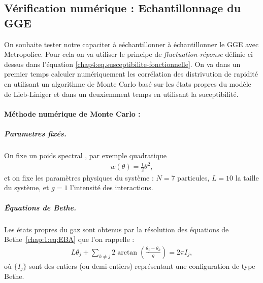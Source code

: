\subsection{Vérification numérique : Echantillonnage du GGE}

On souhaite tester notre capaciter à eéchantillonner à échantillonner le GGE avec Metropolice. Pour cela on va utiliser le principe de \emph{fluctuation-réponse} définie ci dessus dans l'équation \eqref{chap4:eq.susceptibilite-fonctionnelle}. On va dans un premier temps calculer numériquement les corrélation des distrivution de rapidité en utilisant un algorithme de Monte Carlo basé sur les états propres du modèle de Lieb-Liniger et dans un deuxiemment temps en utilisant la suceptibilité.




\paragraph{Méthode numérique de Monte Carlo  :} 

\subparagraph{Parametres fixés.}
On fixe un poids spectral , par exemple quadratique
\begin{eqnarray}
	w(\theta) = \tfrac{1}{2} \theta^2,
\end{eqnarray}
et on fixe les paramètres physiques du système : \( N = 7 \) particules, \( L = 10 \) la taille du système, et \( g = 1 \) l’intensité des interactions.

\subparagraph{Équations de Bethe.}
Les états propres du gaz sont obtenus par la résolution des équations de Bethe~\eqref{chap:1:eq:EBA} que l'on rappelle :
\begin{eqnarray}
	L \theta_j + \sum_{k \ne j} 2 \arctan \left( \frac{\theta_j - \theta_k}{g} \right) = 2 \pi I_j,
\end{eqnarray}
où \( \{I_j\} \) sont des entiers (ou demi-entiers) représentant une configuration de type Bethe.\\

